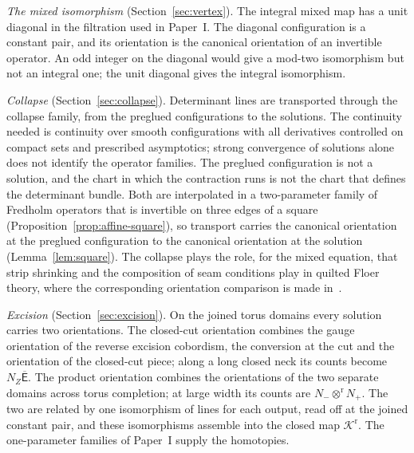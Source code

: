 \documentclass[11pt]{amsart}
\theoremstyle{definition}
\theoremstyle{remark}
\theoremstyle{plain}
\numberwithin{equation}{section}
\begin{document}
\emph{The mixed isomorphism} (Section~\ref{sec:vertex}). The integral mixed map has a unit diagonal
in the filtration used in Paper~I. The diagonal configuration is a constant pair, and its
orientation is the canonical orientation of an invertible operator. An odd integer on the diagonal
would give a mod-two isomorphism but not an integral one; the unit diagonal gives the integral
isomorphism.

\emph{Collapse} (Section~\ref{sec:collapse}). Determinant lines are transported through the collapse
family, from the preglued configurations to the solutions. The continuity needed is continuity over
smooth configurations with all derivatives controlled on compact sets and prescribed asymptotics;
strong convergence of solutions alone does not identify the operator families. The preglued
configuration is not a solution, and the chart in which the contraction runs is not the chart that
defines the determinant bundle. Both are interpolated in a two-parameter family of Fredholm
operators that is invertible on three edges of a square (Proposition~\ref{prop:affine-square}), so
transport carries the canonical orientation at the preglued configuration to the canonical
orientation at the solution (Lemma~\ref{lem:square}). The
collapse plays the role, for the mixed equation, that strip shrinking and the composition of seam
conditions play in quilted Floer theory, where the corresponding orientation comparison is made
in~\cite{WW-orientations}.

\emph{Excision} (Section~\ref{sec:excision}). On the joined torus domains every solution carries
two orientations. The closed-cut orientation combines the gauge orientation of the reverse excision
cobordism, the conversion at the cut and the orientation of the closed-cut piece; along a long
closed neck its counts become $N_Z\overline{\mathsf E}$. The product orientation combines the
orientations of the two separate domains across torus completion; at large width its counts are
$N_-\otimes^{\mathrm r}N_+$. The two are related by one isomorphism of lines for each output, read off at the
joined constant pair, and these isomorphisms assemble into the closed map $\mathcal K^{\mathrm r}$. The
one-parameter families of Paper~I supply the homotopies.
\end{document}
